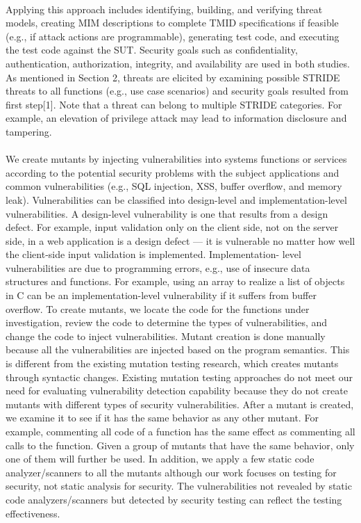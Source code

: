 \paragraph*{}
Applying this approach includes identifying, building, and verifying threat
models, creating MIM descriptions to complete TMID specifications if feasible (e.g., if attack actions are programmable), generating test code, and executing the test code against the SUT. Security goals such as confidentiality,
authentication, authorization, integrity, and availability are
used in both studies. As mentioned in Section 2, threats are
elicited by examining possible STRIDE threats to all functions
(e.g., use case scenarios) and security goals resulted
from first step[1]. Note that a threat can belong to multiple STRIDE
categories. For example, an elevation of privilege attack may
lead to information disclosure and tampering.
\paragraph*{}
We create mutants by injecting vulnerabilities
into systems functions or services according to the potential
security problems with the subject applications and
common vulnerabilities (e.g., SQL injection, XSS, buffer
overflow, and memory leak). Vulnerabilities can be classified
into design-level and implementation-level vulnerabilities.
A design-level vulnerability is one that results from a
design defect. For example, input validation only on the
client side, not on the server side, in a web application is a
design defect — it is vulnerable no matter how well the
client-side input validation is implemented. Implementation-
level vulnerabilities are due to programming errors,
e.g., use of insecure data structures and functions. For
example, using an array to realize a list of objects in C can
be an implementation-level vulnerability if it suffers from
buffer overflow. To create mutants, we locate the code for
the functions under investigation, review the code to
determine the types of vulnerabilities, and change the code
to inject vulnerabilities. Mutant creation is done manually
because all the vulnerabilities are injected based on the
program semantics. This is different from the existing
mutation testing research, which creates mutants through
syntactic changes. Existing mutation testing approaches
do not meet our need for evaluating vulnerability detection
capability because they do not create mutants with different
types of security vulnerabilities. After a mutant is created,
we examine it to see if it has the same behavior as any other
mutant. For example, commenting all code of a function has
the same effect as commenting all calls to the function.
Given a group of mutants that have the same behavior, only
one of them will further be used. In addition, we apply a
few static code analyzer/scanners to all the mutants
although our work focuses on testing for security, not static
analysis for security. The vulnerabilities not revealed by
static code analyzers/scanners but detected by security
testing can reflect the testing effectiveness.
